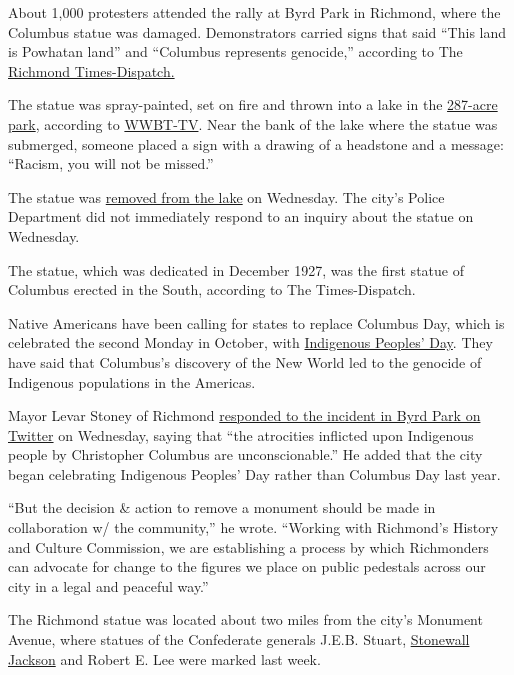 About 1,000 protesters attended the rally at Byrd Park in Richmond,
where the Columbus statue was damaged. Demonstrators carried signs that
said ``This land is Powhatan land'' and ``Columbus represents
genocide,'' according to The
\href{https://www.richmond.com/news/local/watch-now-protesters-stand-in-solidarity-with-indigenous-peoples-at-byrd-park-where-columbus-statue/article_8a009c9c-1c5d-5e2a-a3bf-0b015a8a2277.html}{Richmond
Times-Dispatch.}

The statue was spray-painted, set on fire and thrown into a lake in the
\href{http://www.richmondgov.com/parks/parkbyrd.aspx}{287-acre park},
according to
\href{https://www.nbc12.com/2020/06/09/christopher-columbus-statue-torn-down-thrown-lake-by-protesters/}{WWBT-TV}.
Near the bank of the lake where the statue was submerged, someone placed
a sign with a drawing of a headstone and a message: ``Racism, you will
not be missed.''

The statue was
\href{https://twitter.com/OliviaNBC12/status/1270697627731013634}{removed
from the lake} on Wednesday. The city's Police Department did not
immediately respond to an inquiry about the statue on Wednesday.

The statue, which was dedicated in December 1927, was the first statue
of Columbus erected in the South, according to The Times-Dispatch.

Native Americans have been calling for states to replace Columbus Day,
which is celebrated the second Monday in October, with
\href{https://www.nytimes3xbfgragh.onion/2019/10/14/nyregion/indigenous-day.html}{Indigenous
Peoples' Day}. They have said that Columbus's discovery of the New World
led to the genocide of Indigenous populations in the Americas.

Mayor Levar Stoney of Richmond
\href{https://twitter.com/LevarStoney/status/1270794688140849152}{responded
to the incident in Byrd Park on Twitter} on Wednesday, saying that ``the
atrocities inflicted upon Indigenous people by Christopher Columbus are
unconscionable.'' He added that the city began celebrating Indigenous
Peoples' Day rather than Columbus Day last year.

``But the decision \& action to remove a monument should be made in
collaboration w/ the community,'' he wrote. ``Working with Richmond's
History and Culture Commission, we are establishing a process by which
Richmonders can advocate for change to the figures we place on public
pedestals across our city in a legal and peaceful way.''

The Richmond statue was located about two miles from the city's Monument
Avenue, where statues of the Confederate generals J.E.B. Stuart,
\href{https://www.nytimes3xbfgragh.onion/2020/07/02/us/stonewall-jackson-statue-richmond.html}{Stonewall
Jackson} and Robert E. Lee were marked last week.

